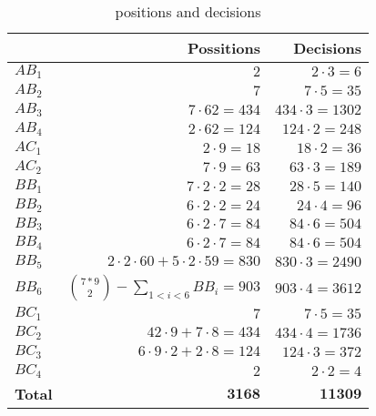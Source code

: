 \begin{wraptable}{r}{0.55\textwidth}
  \centering
  \begin{tabular}{| l | r | r |}
    \hline
    & Possitions & Decisions \\ \hline
    $AB_{1}$ & $2$ & $2\cdot3=6$ \\ \hline
    $AB_{2}$ & $7$ & $7\cdot5=35$ \\ \hline
    $AB_{3}$ & $7\cdot62=434$ & $434\cdot3=1302$ \\ \hline
    $AB_{4}$ & $2\cdot62=124$ & $124\cdot2=248$ \\ \hline \hline

    $AC_{1}$ & $2\cdot9=18$ & $18\cdot2=36$ \\ \hline
    $AC_{2}$ & $7\cdot9=63$ & $63\cdot3=189$ \\ \hline \hline

    $BB_{1}$ & $7\cdot2\cdot2=28$ & $28\cdot5=140$ \\ \hline
    $BB_{2}$ & $6\cdot2\cdot2=24$ & $24\cdot4=96$ \\ \hline
    $BB_{3}$ & $6\cdot2\cdot7=84$ & $84\cdot6=504$ \\ \hline
    $BB_{4}$ & $6\cdot2\cdot7=84$ & $84\cdot6=504$ \\ \hline
    $BB_{5}$ & $2\cdot2\cdot60 + 5\cdot2\cdot59=830$ & $830\cdot3=2490$ \\ \hline
    $BB_{6}$ &
      $\displaystyle{7*9\choose2}-\sum_{1<i<6}\!BB_{i}=903$ &
      $903\cdot4=3612$ \\ \hline \hline

    $BC_{1}$ & $7$ & $7\cdot5=35$ \\ \hline
    $BC_{2}$ & $42\cdot9 + 7\cdot8=434$ & $434\cdot4=1736$ \\ \hline
    $BC_{3}$ & $6\cdot9\cdot2 + 2\cdot8=124$ & $124\cdot3=372$ \\ \hline
    $BC_{4}$ & $2$ & $2\cdot2=4$ \\ \hline \hline

    \textbf{Total} & $\textbf{3168}$ & $\textbf{11309}$ \\ \hline
  \end{tabular}
  \vspace*{-0.25cm}
  \caption{positions and decisions}
  \label{tab:positions}
  \vspace*{-0.60cm}
\end{wraptable}
